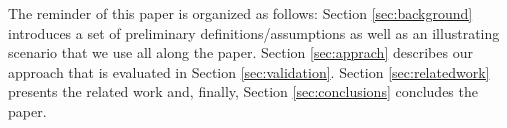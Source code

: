 The reminder of this paper is organized as follows: Section \ref{sec:background} introduces a set of preliminary definitions/assumptions as well as an illustrating scenario that we use all along the paper. Section \ref{sec:apprach} describes our approach that is evaluated in Section \ref{sec:validation}. Section \ref{sec:relatedwork} presents the related work and, finally, Section \ref{sec:conclusions} concludes the paper. 








